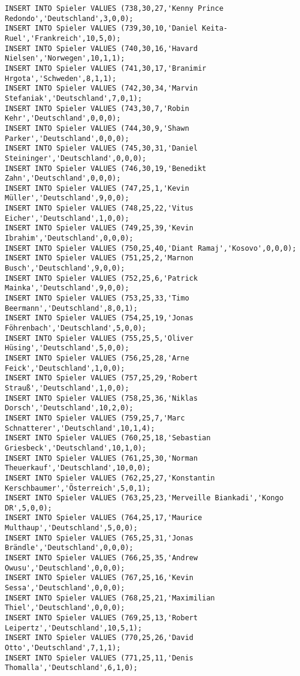 \documentclass{lehramt-informatik-aufgabe}
\begin{document}
\begin{verbatim}
INSERT INTO Spieler VALUES (738,30,27,'Kenny Prince Redondo','Deutschland',3,0,0);
INSERT INTO Spieler VALUES (739,30,10,'Daniel Keita-Ruel','Frankreich',10,5,0);
INSERT INTO Spieler VALUES (740,30,16,'Havard Nielsen','Norwegen',10,1,1);
INSERT INTO Spieler VALUES (741,30,17,'Branimir Hrgota','Schweden',8,1,1);
INSERT INTO Spieler VALUES (742,30,34,'Marvin Stefaniak','Deutschland',7,0,1);
INSERT INTO Spieler VALUES (743,30,7,'Robin Kehr','Deutschland',0,0,0);
INSERT INTO Spieler VALUES (744,30,9,'Shawn Parker','Deutschland',0,0,0);
INSERT INTO Spieler VALUES (745,30,31,'Daniel Steininger','Deutschland',0,0,0);
INSERT INTO Spieler VALUES (746,30,19,'Benedikt Zahn','Deutschland',0,0,0);
INSERT INTO Spieler VALUES (747,25,1,'Kevin Müller','Deutschland',9,0,0);
INSERT INTO Spieler VALUES (748,25,22,'Vitus Eicher','Deutschland',1,0,0);
INSERT INTO Spieler VALUES (749,25,39,'Kevin Ibrahim','Deutschland',0,0,0);
INSERT INTO Spieler VALUES (750,25,40,'Diant Ramaj','Kosovo',0,0,0);
INSERT INTO Spieler VALUES (751,25,2,'Marnon Busch','Deutschland',9,0,0);
INSERT INTO Spieler VALUES (752,25,6,'Patrick Mainka','Deutschland',9,0,0);
INSERT INTO Spieler VALUES (753,25,33,'Timo Beermann','Deutschland',8,0,1);
INSERT INTO Spieler VALUES (754,25,19,'Jonas Föhrenbach','Deutschland',5,0,0);
INSERT INTO Spieler VALUES (755,25,5,'Oliver Hüsing','Deutschland',5,0,0);
INSERT INTO Spieler VALUES (756,25,28,'Arne Feick','Deutschland',1,0,0);
INSERT INTO Spieler VALUES (757,25,29,'Robert Strauß','Deutschland',1,0,0);
INSERT INTO Spieler VALUES (758,25,36,'Niklas Dorsch','Deutschland',10,2,0);
INSERT INTO Spieler VALUES (759,25,7,'Marc Schnatterer','Deutschland',10,1,4);
INSERT INTO Spieler VALUES (760,25,18,'Sebastian Griesbeck','Deutschland',10,1,0);
INSERT INTO Spieler VALUES (761,25,30,'Norman Theuerkauf','Deutschland',10,0,0);
INSERT INTO Spieler VALUES (762,25,27,'Konstantin Kerschbaumer','Österreich',5,0,1);
INSERT INTO Spieler VALUES (763,25,23,'Merveille Biankadi','Kongo DR',5,0,0);
INSERT INTO Spieler VALUES (764,25,17,'Maurice Multhaup','Deutschland',5,0,0);
INSERT INTO Spieler VALUES (765,25,31,'Jonas Brändle','Deutschland',0,0,0);
INSERT INTO Spieler VALUES (766,25,35,'Andrew Owusu','Deutschland',0,0,0);
INSERT INTO Spieler VALUES (767,25,16,'Kevin Sessa','Deutschland',0,0,0);
INSERT INTO Spieler VALUES (768,25,21,'Maximilian Thiel','Deutschland',0,0,0);
INSERT INTO Spieler VALUES (769,25,13,'Robert Leipertz','Deutschland',10,5,1);
INSERT INTO Spieler VALUES (770,25,26,'David Otto','Deutschland',7,1,1);
INSERT INTO Spieler VALUES (771,25,11,'Denis Thomalla','Deutschland',6,1,0);

\end{verbatim}
\end{document}
